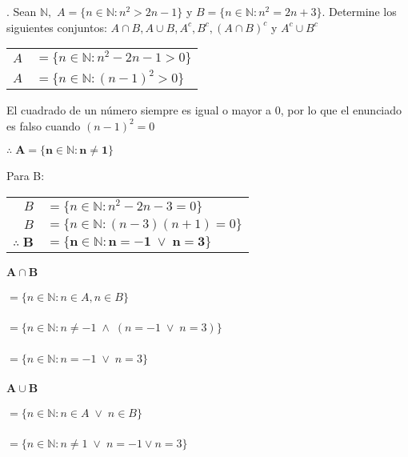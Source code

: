 \section{}
. Sean $\mathbb{N},$ $A = \{n \in \mathbb{N} : n^2 > 2n-1\}$ y $B = \{n \in \mathbb{N} : n^2 = 2n+3\}$. Determine los siguientes conjuntos: $A \cap B, A \cup B, A^c , B^c , (A\cap B)^c $ y $A^c \cup B^c$\\

\begin{center}
\begin{tabular}{r l}
$A$ & $= \{n \in \mathbb{N} : n^2 - 2n-1 > 0\}$\\
$A$ & $= \{n \in \mathbb{N} : (n-1)^2 > 0\}$
\end{tabular}

\end{center}
El cuadrado de un número siempre es igual o mayor a $0$, por lo que el enunciado es falso cuando $(n-1)^2 = 0$\\
\begin{center}
$\mathbf{\therefore \; A = \{n \in \mathbb{N} : n \neq 1\}}$
\end{center}
Para B:
\begin{center}
\begin{tabular}{r l}
$B$ & $= \{n \in \mathbb{N} : n^2 -2n -3= 0\}$\\
$B$ & $= \{n \in \mathbb{N} : (n-3)(n+1) = 0\}$\\
$\mathbf{\therefore \; B}$ & $= \mathbf{\{n \in \mathbb{N} : n=-1\; \vee \; n = 3\}}$
\end{tabular}

\end{center}

\paragraph{$\mathbf{A \cap B}$}

	\subparagraph{$= \{n \in \mathbb{N} : n \in A, n \in B\}$}

	\subparagraph{$= \{n \in \mathbb{N} : n \neq -1 \; \wedge \; (n=-1 \; \vee \; n = 3)\}$}
	\subparagraph{$= \{n \in \mathbb{N} : n=-1 \; \vee \; n = 3\}$}	
\paragraph{$\mathbf{A \cup B}$}
	
	\subparagraph{$= \{n \in \mathbb{N} : n \in A \; \vee \; n \in B\}$}
	\subparagraph{$= \{n \in \mathbb{N} : n \neq 1 \; \vee \; n = -1 \vee n=3\}$}
	
